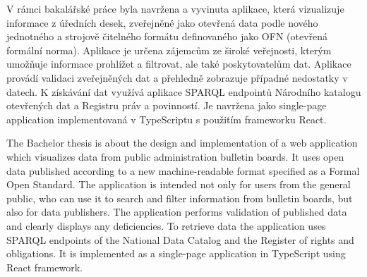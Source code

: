 \documentclass[12pt]{report}
\begin{document}

V rámci bakalářské práce byla navržena a vyvinuta aplikace, která vizualizuje informace z úředních desek, zveřejněné jako otevřená data podle nového jednotného a strojově čitelného formátu definovaného jako OFN (otevřená formální norma).
Aplikace je určena zájemcům ze široké veřejnosti, kterým umožňuje informace prohlížet a filtrovat, ale také poskytovatelům dat. Aplikace provádí validaci zveřejněných dat a přehledně zobrazuje případné nedostatky v datech.
K získávání dat využívá aplikace SPARQL endpointů Národního katalogu otevřených dat a Registru práv a povinností. Je navržena jako single-page application implementovaná v TypeScriptu s použitím frameworku React.


The Bachelor thesis is about the design and implementation of a web application which visualizes data from public administration bulletin boards. It uses open data published according to a new machine-readable format specified as a Formal Open Standard.
The application is intended not only for users from the general public, who can use it to search and filter information from bulletin boards, but also for data publishers. The application performs validation of published data and clearly displays any deficiencies.
To retrieve data the application uses SPARQL endpoints of the National Data Catalog and the Register of rights and obligations. It is implemented as a single-page application in TypeScript using React framework.
\end{document}
